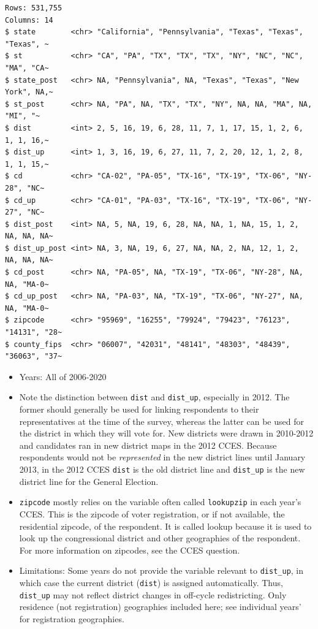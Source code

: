 \documentclass[10pt,article,oneside]{memoir}
\theoremstyle{definition}
\begin{document}
\begin{verbatim}
Rows: 531,755
Columns: 14
$ state        <chr> "California", "Pennsylvania", "Texas", "Texas", "Texas", ~
$ st           <chr> "CA", "PA", "TX", "TX", "TX", "NY", "NC", "NC", "MA", "CA~
$ state_post   <chr> NA, "Pennsylvania", NA, "Texas", "Texas", "New York", NA,~
$ st_post      <chr> NA, "PA", NA, "TX", "TX", "NY", NA, NA, "MA", NA, "MI", "~
$ dist         <int> 2, 5, 16, 19, 6, 28, 11, 7, 1, 17, 15, 1, 2, 6, 1, 1, 16,~
$ dist_up      <int> 1, 3, 16, 19, 6, 27, 11, 7, 2, 20, 12, 1, 2, 8, 1, 1, 15,~
$ cd           <chr> "CA-02", "PA-05", "TX-16", "TX-19", "TX-06", "NY-28", "NC~
$ cd_up        <chr> "CA-01", "PA-03", "TX-16", "TX-19", "TX-06", "NY-27", "NC~
$ dist_post    <int> NA, 5, NA, 19, 6, 28, NA, NA, 1, NA, 15, 1, 2, NA, NA, NA~
$ dist_up_post <int> NA, 3, NA, 19, 6, 27, NA, NA, 2, NA, 12, 1, 2, NA, NA, NA~
$ cd_post      <chr> NA, "PA-05", NA, "TX-19", "TX-06", "NY-28", NA, NA, "MA-0~
$ cd_up_post   <chr> NA, "PA-03", NA, "TX-19", "TX-06", "NY-27", NA, NA, "MA-0~
$ zipcode      <chr> "95969", "16255", "79924", "79423", "76123", "14131", "28~
$ county_fips  <chr> "06007", "42031", "48141", "48303", "48439", "36063", "37~
\end{verbatim}

\begin{itemize}
\tightlist
\item
  Years: All of 2006-2020
\item
  Note the distinction between \texttt{dist} and \texttt{dist\_up},
  especially in 2012. The former should generally be used for linking
  respondents to their representatives at the time of the survey,
  whereas the latter can be used for the district in which they will
  vote for. New districts were drawn in 2010-2012 and candidates ran in
  new district maps in the 2012 CCES. Because respondents would not be
  \emph{represented} in the new district lines until January 2013, in
  the 2012 CCES \texttt{dist} is the old district line and
  \texttt{dist\_up} is the new district line for the General Election.
\item
  \texttt{zipcode} mostly relies on the variable often called
  \texttt{lookupzip} in each year's CCES. This is the zipcode of voter
  registration, or if not available, the residential zipcode, of the
  respondent. It is called lookup because it is used to look up the
  congressional district and other geographies of the respondent. For
  more information on zipcodes, see the CCES question.
\item
  Limitations: Some years do not provide the variable relevant to
  \texttt{dist\_up}, in which case the current district (\texttt{dist})
  is assigned automatically. Thus, \texttt{dist\_up} may not reflect
  district changes in off-cycle redistricting. Only residence (not
  registration) geographies included here; see individual years' for
  registration geographies.
\end{itemize}
\end{document}
